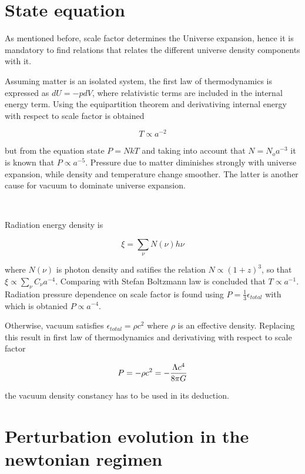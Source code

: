 \section{ State equation }

As mentioned before, scale factor determines the Universe expansion, 
hence it is mandatory to find relations that relates the different universe 
density components with it. 

Assuming matter is an isolated system, the first law of thermodynamics is
expressed as $dU = -pdV$, where relativistic terms are included in the 
internal energy term. Using the equipartition theorem and derivativing 
internal energy with respect to scale factor is obtained 

\[ T \propto a^{-2} \]

but from the equation state $P = NkT$ and taking into account that $N = N_oa^{-3}$  
it is known that  $P \propto a^{-5}$. Pressure due to matter diminishes 
strongly with universe expansion, while density and temperature change smoother. 
The latter is another cause for vacuum to dominate universe expansion. 

\

Radiation energy density is

\[\xi=\sum_{\nu}N(\nu)h\nu\]

where $N(\nu)$ is photon density and satifies the relation $N \propto (1+z)^3$,
so that $\xi \propto  \sum_\nu C_\nu a^{-4} $. Comparing with Stefan Boltzmann
law is concluded that $T\propto a^{-1}$. Radiation pressure dependence on scale
factor is found using $ P=\frac{1}{3}\epsilon_{total}$ with which is obtanied
$P \propto a^{-4}$. 

Otherwise, vacuum satisfies $\epsilon_{total}=\rho c^2$ where $\rho$
is an effective density. Replacing this result in first law of thermodynamics
and derivativing with respect to scale factor  

\[ P=-\rho c^2 = -\frac{ \Lambda c^4}{8\pi G}\]

the vacuum density constancy has to be used in its deduction.

\section{ Perturbation evolution in the newtonian regimen }

